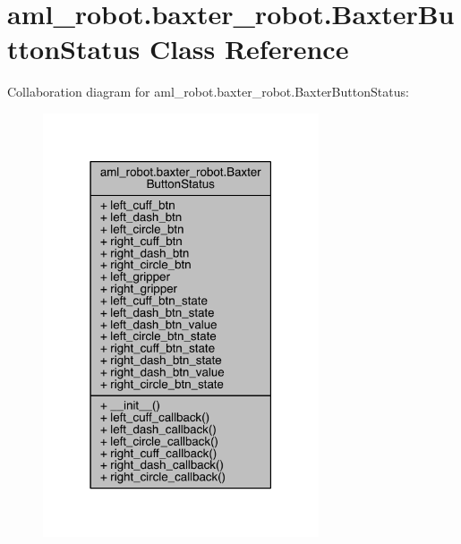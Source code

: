 \hypertarget{classaml__robot_1_1baxter__robot_1_1_baxter_button_status}{}\section{aml\+\_\+robot.\+baxter\+\_\+robot.\+Baxter\+Button\+Status Class Reference}
\label{classaml__robot_1_1baxter__robot_1_1_baxter_button_status}


Collaboration diagram for aml\+\_\+robot.\+baxter\+\_\+robot.\+Baxter\+Button\+Status\+:
\nopagebreak
\begin{figure}[H]
\begin{center}
\leavevmode
\includegraphics[width=231pt]{classaml__robot_1_1baxter__robot_1_1_baxter_button_status__coll__graph}
\end{center}
\end{figure}
